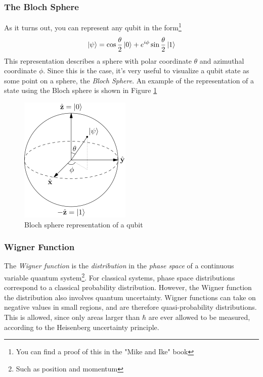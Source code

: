 \subsubsection{The Bloch Sphere}
As it turns out, you can represent any qubit in the form\footnote{You can find a proof of this in the "Mike and Ike" book}
\[
    \ket{\psi} = \cos{\frac{\theta}{2}}\ket{0} + e^{i \phi} \sin{\frac{\theta}{2}}\ket{1}
\]
This representation describes a sphere with polar coordinate $\theta$ and azimuthal coordinate $\phi$. Since this is the case, it's very useful to visualize a qubit state as some point on a sphere, the \textit{Bloch Sphere}. An example of the representation of a state using the Bloch sphere is shown in Figure \ref{fig:Bloch-Sphere}
\begin{figure}[H]
    \centering
    \includegraphics[width=0.3\columnwidth]{Bloch.png}
    \caption{Bloch sphere representation of a qubit}
    \label{fig:Bloch-Sphere}
\end{figure}

\subsubsection{Wigner Function}
The \textit{Wigner function} is the \textit{distribution} in the \textit{phase space} of a continuous variable quantum system\footnote{Such as position and momentum}. For classical systems, phase space distributions correspond to a classical probability distribution. However, the Wigner function the distribution also involves quantum uncertainty. Wigner functions can take on negative values in small regions, and are therefore quasi-probability distributions. This is allowed, since only areas larger than $\hbar$ are ever allowed to be measured, according to the Heisenberg uncertainty principle.

